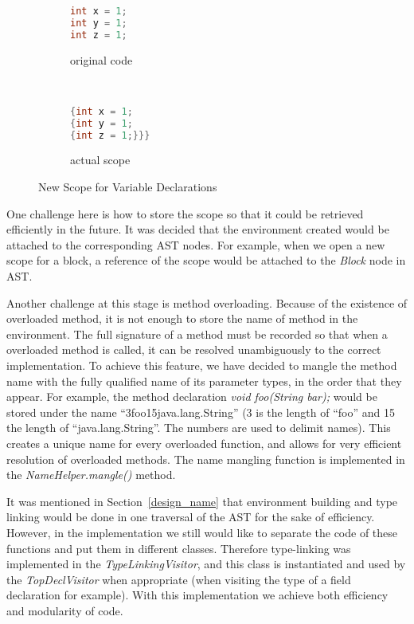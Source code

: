 \documentclass[a4paper, notitlepage]{report}
\begin{document}
\begin{figure}
\centering
\begin{subfigure}{0.4\textwidth}
\begin{lstlisting}[language=Java, frame=single]
int x = 1;
int y = 1;
int z = 1;
\end{lstlisting}
\caption{original code}
\label{var_1}
\end{subfigure}
~
\begin{subfigure}{0.4\textwidth}

\begin{lstlisting}[language=Java, frame=single]
{int x = 1;
{int y = 1;
{int z = 1;}}}
\end{lstlisting}
\caption{actual scope}
\label{var_2}
\end{subfigure}
\caption{New Scope for Variable Declarations}
\label{var_decl}
\end{figure}

One challenge here is how to store the scope so that it could be retrieved efficiently in the future. It was decided that the environment created would be attached to the corresponding AST nodes. For example, when we open a new scope for a block, a reference of the scope would be attached to the \emph{Block} node in AST.

Another challenge at this stage is method overloading. Because of the existence of overloaded method, it is not enough to store the name of method in the environment. The full signature of a method must be recorded so that when a overloaded method is called, it can be resolved unambiguously to the correct implementation. To achieve this feature, we have decided to mangle the method name with the fully qualified name of its parameter types, in the order that they appear. For example, the method declaration \emph{void foo(String bar);} would be stored under the name ``3foo15java.lang.String'' (3 is the length of ``foo'' and 15 the length of ``java.lang.String''. The numbers are used to delimit names). This creates a unique name for every overloaded function, and allows for very efficient resolution of overloaded methods. The name mangling function is implemented in the \emph{NameHelper.mangle()} method. 

It was mentioned in Section~\ref{design_name} that environment building and type linking would be done in one traversal of the AST for the sake of efficiency. However, in the implementation we still would like to separate the code of these functions and put them in different classes. Therefore type-linking was implemented in the \emph{TypeLinkingVisitor}, and this class is instantiated and used by the \emph{TopDeclVisitor} when appropriate (when visiting the type of a field declaration for example). With this implementation we achieve both efficiency and modularity of code.
\end{document}

